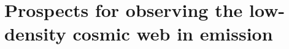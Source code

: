 \chapter{Prospects for observing the low-density cosmic web in \texorpdfstring{\lymana}{\lymanatext} emission}
\label{ch:Prospects for observing the low-density cosmic web in Lya emission}

\ifsetDraft
\else
    \renewcommand{\CurrentTitleColor}{\color{black}}
    
    \BgThispage
    
    \fancyhf{}
    \fancyfoot[C]{\color{lightgray}\thepage}
    \newpage
    \setFancyHdr
\fi


